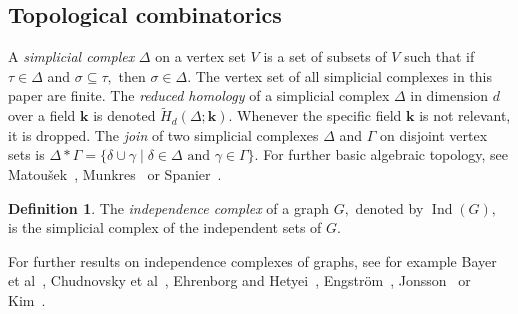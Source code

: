 \documentclass{article}
\theoremstyle{plain}
\theoremstyle{definition}
\newtheorem{defn}{Definition}
\begin{document}
\subsection{Topological combinatorics}
A \emph{simplicial complex} $\Delta$ on a vertex set $V$ is a set of subsets of $V$ such that if $\tau \in \Delta$ and $\sigma \subseteq \tau,$ then $\sigma \in \Delta.$ The vertex set of all simplicial complexes in this paper are finite. The \emph{reduced homology} of a simplicial complex $\Delta$ in dimension $d$ over a field $\mathbf{k}$ is denoted 
$\widetilde{H}_d(\Delta ; \mathbf{k}).$ Whenever the specific field $\mathbf{k}$ is not relevant, it is dropped. The \emph{join} of two simplicial complexes $\Delta$ and $\Gamma$ on disjoint vertex sets is $\Delta \ast \Gamma = \{\delta \cup \gamma \mid \delta \in \Delta \textrm{ and } \gamma \in \Gamma \}.$
For further basic algebraic topology, see Matou\v{s}ek~\cite{matousek2008}, Munkres~\cite{munkres1984} or Spanier~\cite{spanier1966}.
\begin{defn}
The \emph{independence complex} of a graph $G,$ denoted by $\operatorname{Ind}(G),$ is the simplicial complex of the independent sets of $G.$
\end{defn}
For further results on independence complexes of graphs, see for example Bayer et al~\cite{bayer2026}, Chudnovsky et al~\cite{chudnovsky2020}, Ehrenborg and Hetyei~\cite{ehrenborg2006}, Engstr\"om~\cite{engstrom2008, engstrom2009}, Jonsson~\cite{jonsson2008, jonsson2010} or Kim~\cite{kim2022, kim2026}.
\end{document}
